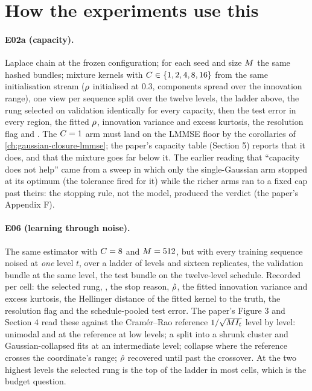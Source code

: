 \section{How the experiments use this}

\paragraph{E02a (capacity).} Laplace chain at the frozen configuration; for each seed
and size $M$ the same hashed bundles; mixture kernels with
$C\in\{1,2,4,8,16\}$ from the same initialisation stream ($\rho$ initialised at
$0.3$, components spread over the innovation range), one view per sequence split over
the twelve levels, the ladder above, the rung selected on validation identically for
every capacity, then the test error in every region, the fitted $\rho$, innovation
variance and excess kurtosis, the resolution flag and . The $C=1$ arm
must land on the LMMSE floor by the corollaries of \cref{ch:gaussian-closure-lmmse};
the paper's capacity table (Section 5) reports that it does, and that the mixture goes
far below it. The
earlier reading that ``capacity does not help'' came from a sweep in which only the
single-Gaussian arm stopped at its optimum (the tolerance fired for it) while the richer
arms ran to a fixed cap past theirs: the stopping rule, not the model, produced the
verdict (the paper's Appendix F).

\paragraph{E06 (learning through noise).} The same estimator with $C=8$ and
$M=512$, but with every training sequence noised at \emph{one} level $t$, over a
ladder of levels and sixteen replicates, the validation bundle at the same level, the
test bundle on the twelve-level schedule. Recorded per cell: the selected rung,
, the stop reason, $\hat{\rho}$, the fitted innovation variance and excess
kurtosis, the Hellinger distance of the fitted kernel to the truth, the resolution
flag and the schedule-pooled test error. The paper's Figure 3 and Section 4 read these
against the Cram\'er--Rao reference $1/\sqrt{M I_t}$ level by level: unimodal and at
the reference at low levels; a split into a shrunk cluster and Gaussian-collapsed fits
at an intermediate level; collapse where the reference crosses the coordinate's range;
$\hat{\rho}$ recovered until past the crossover. At the two highest levels the selected
rung is the top of the ladder in most cells, which is the budget question.

